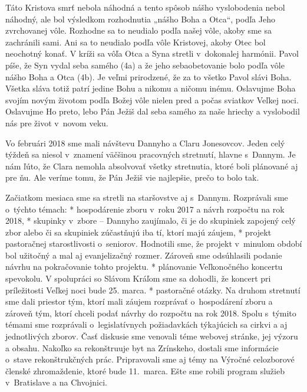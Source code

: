 Táto Kristova smrť nebola náhodná a tento spôsob nášho vyslobodenia nebol náhodný, ale bol výsledkom rozhodnutia „nášho Boha a Otca“, podľa Jeho zvrchovanej vôle. Rozhodne sa to neudialo podľa našej vôle, akoby sme sa zachránili sami. Ani sa to neudialo podľa vôle Kristovej, akoby Otec bol neochotný konať. V kríži sa vôľa Otca a Syna stretli v~dokonalej harmónii. Pavol píše, že Syn vydal seba samého (4a) a že jeho sebaobetovanie bolo podľa vôle nášho Boha a Otca (4b).
Je veľmi prirodzené, že za to všetko Pavol slávi Boha. Všetka sláva totiž patrí jedine Bohu a nikomu a ničomu inému. Oslavujme Boha svojím novým životom podľa Božej vôle nielen pred a počas sviatkov Veľkej noci. Oslavujme Ho preto, lebo Pán Ježiš dal seba samého za naše hriechy a vyslobodil nás pre život v~novom veku.



Vo februári 2018 sme mali návštevu Dannyho a Claru Jonesovcov. Jeden celý týždeň sa niesol v~znamení väčšinou pracovných stretnutí, hlavne s~Dannym. Je nám ľúto, že Clara nemohla absolvovať všetky stretnutia, ktoré boli plánované aj pre ňu. Ale veríme tomu, že Pán Ježiš vie najlepšie, prečo to bolo tak.

Začiatkom mesiaca sme sa stretli na staršovstve aj s~Dannym. Rozprávali sme o~týchto témach:
\begitems
* hospodárenie zboru v~roku 2017 a návrh rozpočtu na rok 2018,
* skupinky v~zbore -- Dannyho zaujímalo, či je do skupiniek zapojený celý zbor alebo či sa skupiniek zúčastňujú iba tí, ktorí majú záujem,
* projekt pastoračnej starostlivosti o~seniorov. Hodnotili sme, že projekt v~minulom období bol užitočný a mal aj evanjelizačný rozmer. Zároveň sme odsúhlasili podanie návrhu na pokračovanie tohto projektu.
* plánovanie Veľkonočného koncertu spevokolu. V spolupráci so Slávom Kráľom sme sa dohodli, že koncert pri príležitosti Veľkej noci bude 25. marca.
* pastoračné otázky.
\enditems
Na druhom stretnutí sme dali priestor tým, ktorí mali záujem rozprávať o~hospodárení zboru a zároveň tým, ktorí chceli podať návrhy do rozpočtu na rok 2018. Spolu s~týmito témami sme rozprávali o~legislatívnych požiadavkách týkajúcich sa cirkvi a aj jednotlivých zborov. Časť diskusie sme venovali téme webovej stránke, jej výzoru a obsahu. Nakoľko sa rekonštruuje byt na Zrínskeho, dostali sme informácie o~stave rekonštrukčných prác. Pripravovali sme aj témy na Výročné celozborové členské zhromaždenie, ktoré bude 11.~marca. Ešte sme robili program služieb v~Bratislave a na Chvojnici.



